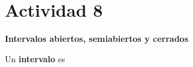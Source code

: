 \section*{Actividad 8}
\textbf{Intervalos abiertos, semiabiertos y cerrados}

Un \textbf{intervalo} es

